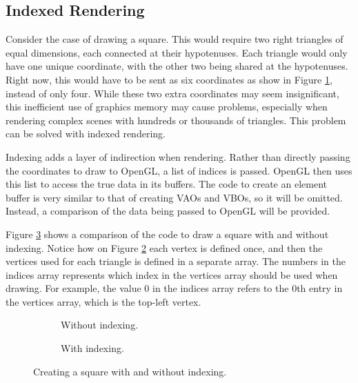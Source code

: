 \documentclass{article}
\begin{document}
\subsection{Indexed Rendering}
Consider the case of drawing a square. This would require two right triangles of equal dimensions, each connected at their hypotenuses. Each triangle would only have one unique coordinate, with the other two being shared at the hypotenuses. Right now, this would have to be sent as six coordinates as show in Figure \ref{fig:square-coords}, instead of only four. While these two extra coordinates may seem insignificant, this inefficient use of graphics memory may cause problems, especially when rendering complex scenes with hundreds or thousands of triangles. This problem can be solved with indexed rendering.

Indexing adds a layer of indirection when rendering. Rather than directly passing the coordinates to draw to OpenGL, a list of indices is passed. OpenGL then uses this list to access the true data in its buffers. The code to create an element buffer is very similar to that of creating VAOs and VBOs, so it will be omitted. Instead, a comparison of the data being passed to OpenGL will be provided.

Figure \ref{fig:square-compare} shows a comparison of the code to draw a square with and without indexing. Notice how on Figure \ref{fig:square-indexed} each vertex is defined once, and then the vertices used for each triangle is defined in a separate array. The numbers in the indices array represents which index in the vertices array should be used when drawing. For example, the value 0 in the indices array refers to the 0th entry in the vertices array, which is the top-left vertex.

\begin{figure}[h]
    \centering
    \begin{subfigure}[h]{0.49\textwidth}
        
        \caption{Without indexing.}
        \label{fig:square-coords}
    \end{subfigure}
    \begin{subfigure}[h]{0.49\textwidth}
        
        \caption{With indexing.}
        \label{fig:square-indexed}
    \end{subfigure}
	\caption{Creating a square with and without indexing.}
	\label{fig:square-compare}
\end{figure}
\end{document}
